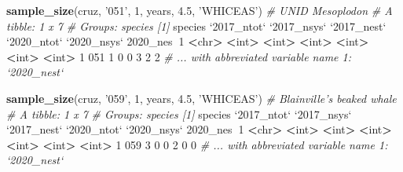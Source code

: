\documentclass[
]{book}
\newenvironment{Shaded}{\begin{snugshade}}{\end{snugshade}}
\newcommand{\CommentTok}[1]{\textcolor[rgb]{0.56,0.35,0.01}{\textit{#1}}}
\newcommand{\DataTypeTok}[1]{\textcolor[rgb]{0.13,0.29,0.53}{#1}}
\newcommand{\DecValTok}[1]{\textcolor[rgb]{0.00,0.00,0.81}{#1}}
\newcommand{\ErrorTok}[1]{\textcolor[rgb]{0.64,0.00,0.00}{\textbf{#1}}}
\newcommand{\FloatTok}[1]{\textcolor[rgb]{0.00,0.00,0.81}{#1}}
\newcommand{\KeywordTok}[1]{\textcolor[rgb]{0.13,0.29,0.53}{\textbf{#1}}}
\newcommand{\NormalTok}[1]{#1}
\newcommand{\OperatorTok}[1]{\textcolor[rgb]{0.81,0.36,0.00}{\textbf{#1}}}
\newcommand{\StringTok}[1]{\textcolor[rgb]{0.31,0.60,0.02}{#1}}
\begin{document}
\begin{Shaded}
\begin{Highlighting}[]
\KeywordTok{sample_size}\NormalTok{(cruz, }\StringTok{'051'}\NormalTok{, }\DecValTok{1}\NormalTok{, years, }\FloatTok{4.5}\NormalTok{, }\StringTok{'WHICEAS'}\NormalTok{) }\CommentTok{# UNID Mesoplodon}
\CommentTok{# A tibble: 1 x 7}
\CommentTok{# Groups:   species [1]}
\NormalTok{  species }\StringTok{`}\DataTypeTok{2017_ntot}\StringTok{`} \StringTok{`}\DataTypeTok{2017_nsys}\StringTok{`} \StringTok{`}\DataTypeTok{2017_nest}\StringTok{`} \StringTok{`}\DataTypeTok{2020_ntot}\StringTok{`} \StringTok{`}\DataTypeTok{2020_nsys}\StringTok{`} \DecValTok{2020}\NormalTok{_nes}\OperatorTok{~}\DecValTok{1}
  \OperatorTok{<}\NormalTok{chr}\OperatorTok{>}\StringTok{         }\ErrorTok{<}\NormalTok{int}\OperatorTok{>}\StringTok{       }\ErrorTok{<}\NormalTok{int}\OperatorTok{>}\StringTok{       }\ErrorTok{<}\NormalTok{int}\OperatorTok{>}\StringTok{       }\ErrorTok{<}\NormalTok{int}\OperatorTok{>}\StringTok{       }\ErrorTok{<}\NormalTok{int}\OperatorTok{>}\StringTok{      }\ErrorTok{<}\NormalTok{int}\OperatorTok{>}
\DecValTok{1} \DecValTok{051}               \DecValTok{1}           \DecValTok{0}           \DecValTok{0}           \DecValTok{3}           \DecValTok{2}          \DecValTok{2}
\CommentTok{# ... with abbreviated variable name 1: `2020_nest`}

\KeywordTok{sample_size}\NormalTok{(cruz, }\StringTok{'059'}\NormalTok{, }\DecValTok{1}\NormalTok{, years, }\FloatTok{4.5}\NormalTok{, }\StringTok{'WHICEAS'}\NormalTok{) }\CommentTok{# Blainville's beaked whale}
\CommentTok{# A tibble: 1 x 7}
\CommentTok{# Groups:   species [1]}
\NormalTok{  species }\StringTok{`}\DataTypeTok{2017_ntot}\StringTok{`} \StringTok{`}\DataTypeTok{2017_nsys}\StringTok{`} \StringTok{`}\DataTypeTok{2017_nest}\StringTok{`} \StringTok{`}\DataTypeTok{2020_ntot}\StringTok{`} \StringTok{`}\DataTypeTok{2020_nsys}\StringTok{`} \DecValTok{2020}\NormalTok{_nes}\OperatorTok{~}\DecValTok{1}
  \OperatorTok{<}\NormalTok{chr}\OperatorTok{>}\StringTok{         }\ErrorTok{<}\NormalTok{int}\OperatorTok{>}\StringTok{       }\ErrorTok{<}\NormalTok{int}\OperatorTok{>}\StringTok{       }\ErrorTok{<}\NormalTok{int}\OperatorTok{>}\StringTok{       }\ErrorTok{<}\NormalTok{int}\OperatorTok{>}\StringTok{       }\ErrorTok{<}\NormalTok{int}\OperatorTok{>}\StringTok{      }\ErrorTok{<}\NormalTok{int}\OperatorTok{>}
\DecValTok{1} \DecValTok{059}               \DecValTok{3}           \DecValTok{0}           \DecValTok{0}           \DecValTok{2}           \DecValTok{0}          \DecValTok{0}
\CommentTok{# ... with abbreviated variable name 1: `2020_nest`}


\end{Highlighting}
\end{Shaded}
\end{document}
